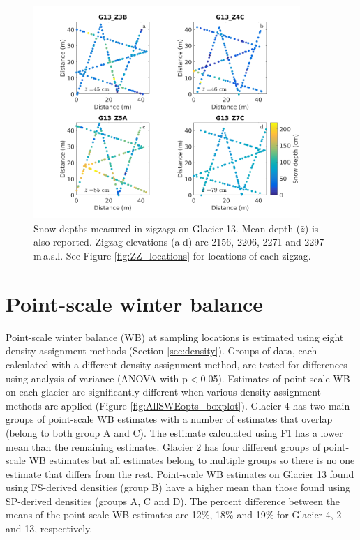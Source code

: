 \documentclass{sfuthesis}
\begin{document}
{\begin{figure}[H] 
	\centering
	 \includegraphics[width=0.9\textwidth]{ZigzagDepth_G13.png}%
	\caption[Snow depths measured in zigzags on Glacier 13]{Snow depths measured in zigzags on Glacier 13. Mean depth ($\bar{z}$) is also reported. Zigzag elevations (a-d) are 2156, 2206, 2271 and 2297 \,m\,a.s.l. See Figure \ref{fig:ZZ_locations} for locations of each zigzag.}
	\label{fig:ZZ_G13}
\end{figure}


\section{Point-scale winter balance}

Point-scale winter balance (WB) at sampling locations is estimated using eight density assignment methods (Section \ref{sec:density}). Groups of data, each calculated with a different density assignment method, are tested for differences using analysis of variance (ANOVA with p$<$0.05). Estimates of point-scale WB on each glacier are significantly different when various density assignment methods are applied (Figure \ref{fig:AllSWEopts_boxplot}). Glacier 4 has two main groups of point-scale WB estimates with a number of estimates that overlap (belong to both group A and C). The estimate calculated using F1 has a lower mean than the remaining estimates. Glacier 2 has four different groups of point-scale WB estimates but all estimates belong to multiple groups so there is no one estimate that differs from the rest. Point-scale WB estimates on Glacier 13 found using FS-derived densities (group B) have a higher mean than those found using SP-derived densities (groups A, C and D). The percent difference between the means of the point-scale WB estimates are 12\%, 18\% and 19\%  for Glacier 4, 2 and 13, respectively. 

}
\end{document}
